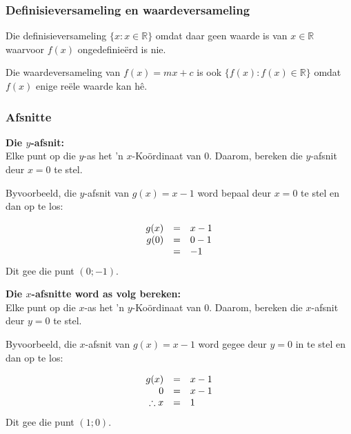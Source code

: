 \subsubsection*{Definisieversameling en waardeversameling}
\nopagebreak
Die definisieversameling $\{x:x\in \mathbb{R}\}$ omdat daar geen waarde is van  $x\in \mathbb{R}$ waarvoor $f(x)$ ongedefinieërd is nie.\par 
Die waardeversameling van $f(x)=mx+c$ is ook $\{f(x):f(x)\in \mathbb{R}\}$ omdat $f(x)$ enige re\"ele waarde kan h\^e.\par 
\par 

\subsubsection*{Afsnitte}
\textbf{Die $y$-afsnit:}\\
Elke punt op die $y$-as het 'n $x$-Ko\"ordinaat van $0$. Daarom, bereken die $y$-afsnit deur $x=0$ te stel.\par
Byvoorbeeld, die $y$-afsnit van $g(x)=x-1$ word bepaal deur $x=0$ te stel en dan op te los:\par 

\begin{equation*}
\begin{array}{ccl}\hfill g(x)& =& x-1\hfill \\
\hfill g(0) &=& 0-1\hfill \\
& =& -1\hfill 
\end{array}
\end{equation*}
Dit gee die punt $(0;-1)$.\par

\textbf{Die $x$-afsnitte word as volg bereken:}\\
Elke punt op die $x$-as het 'n $y$-Ko\"ordinaat van $0$. Daarom, bereken die $x$-afsnit deur $y=0$ te stel. \par
Byvoorbeeld, die $x$-afsnit van $g(x)=x-1$ word gegee deur $y=0$ in te stel en dan op te los:\par 

\begin{equation*}
\begin{array}{ccl}\hfill g(x)& =& x-1\hfill \\
\hfill 0& =& x-1\hfill \\
\hfill \therefore x& =& 1\hfill 
\end{array}
\end{equation*}
Dit gee die punt $(1;0)$.


